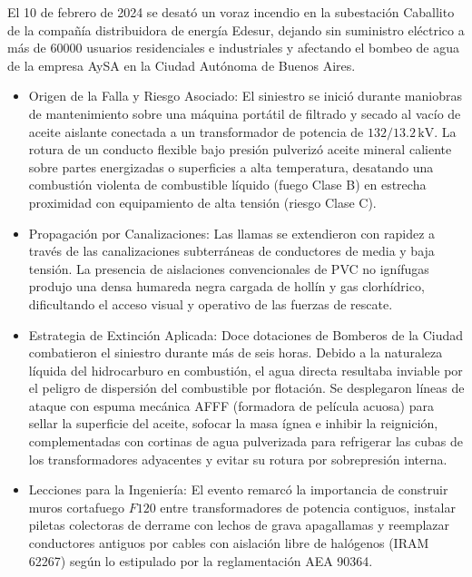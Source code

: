 El 10 de febrero de 2024 se desató un voraz incendio en la subestación Caballito de la compañía distribuidora de energía
Edesur, dejando sin suministro eléctrico a más de $60000$ usuarios residenciales e industriales y afectando el bombeo de
agua de la empresa AySA en la Ciudad Autónoma de Buenos Aires.

\begin{itemize}
    \item Origen de la Falla y Riesgo Asociado: El siniestro se inició durante maniobras de mantenimiento sobre una
          máquina portátil de filtrado y secado al vacío de aceite aislante conectada a un transformador de potencia de
          $132/13.2\,\mathrm{kV}$. La rotura de un conducto flexible bajo presión pulverizó aceite mineral caliente sobre
          partes energizadas o superficies a alta temperatura, desatando una combustión violenta de combustible líquido
          (fuego Clase B) en estrecha proximidad con equipamiento de alta tensión (riesgo Clase C).
    \item Propagación por Canalizaciones: Las llamas se extendieron con rapidez a través de las canalizaciones subterráneas
          de conductores de media y baja tensión. La presencia de aislaciones convencionales de PVC no ignífugas produjo una
          densa humareda negra cargada de hollín y gas clorhídrico, dificultando el acceso visual y operativo de las
          fuerzas de rescate.
    \item Estrategia de Extinción Aplicada: Doce dotaciones de Bomberos de la Ciudad combatieron el siniestro durante más
          de seis horas. Debido a la naturaleza líquida del hidrocarburo en combustión, el agua directa resultaba inviable
          por el peligro de dispersión del combustible por flotación. Se desplegaron líneas de ataque con espuma mecánica
          AFFF (formadora de película acuosa) para sellar la superficie del aceite, sofocar la masa ígnea e inhibir la
          reignición, complementadas con cortinas de agua pulverizada para refrigerar las cubas de los transformadores
          adyacentes y evitar su rotura por sobrepresión interna.
    \item Lecciones para la Ingeniería: El evento remarcó la importancia de construir muros cortafuego $F120$ entre
          transformadores de potencia contiguos, instalar piletas colectoras de derrame con lechos de grava apagallamas y
          reemplazar conductores antiguos por cables con aislación libre de halógenos (IRAM 62267) según lo estipulado por
          la reglamentación AEA 90364.
\end{itemize}

